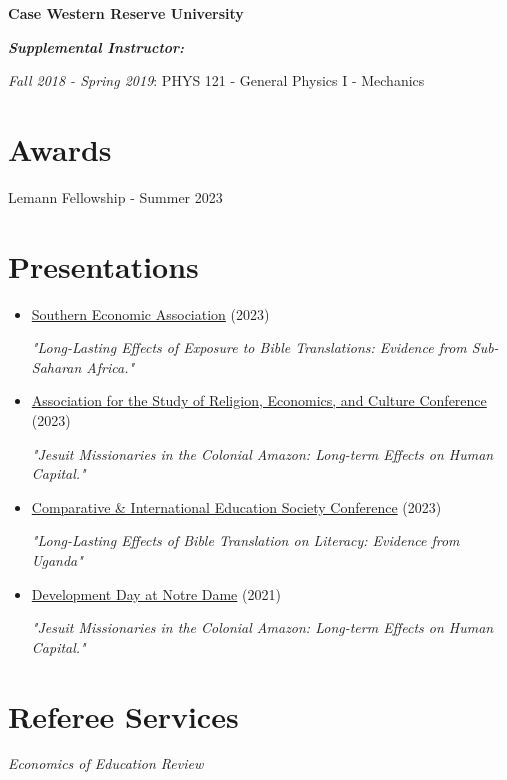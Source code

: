 \documentclass[letterpaper,11pt]{article}
\begin{document}
\begin{adjustwidth}{3mm}{0mm}
  \textbf{Case Western Reserve University}
\end{adjustwidth}

\begin{adjustwidth}{6mm}{0mm}
  \textbf{\textit{Supplemental Instructor:}}
\end{adjustwidth}

\begin{adjustwidth}{9mm}{0mm}
  \textit{Fall 2018 - Spring 2019}: PHYS 121 - General Physics I - Mechanics
\end{adjustwidth}

\section{Awards}

\begin{adjustwidth}{6mm}{0mm}
  Lemann Fellowship - Summer 2023
\end{adjustwidth}

\section{Presentations}
\begin{adjustwidth}{3mm}{0mm}
  \begin{itemize}
    \item \href{https://www.southerneconomic.org/event/7662b305-ad92-474d-8f2c-bce1240b9858/websitePage:e0a9d079-18e0-4413-a0b6-32f8f6b51e64}{Southern Economic Association} (2023) 
    
    \textit{"Long-Lasting Effects of Exposure to Bible Translations: Evidence from Sub-Saharan Africa."}
  \end{itemize}

  \begin{itemize}
    \item \href{http://www.asrec.org/conferences/}{Association for the Study of Religion, Economics, and Culture Conference} (2023) 
    
    \textit{"Jesuit Missionaries in the Colonial Amazon: Long-term Effects on Human Capital."}
  \end{itemize}

  \begin{itemize}
    \item \href{https://cies2023.org/}{Comparative \& International Education Society Conference} (2023) 
    
    \textit{"Long-Lasting Effects of Bible Translation on Literacy: Evidence from Uganda"}
  \end{itemize}

  \begin{itemize}
    \item \href{https://kellogg.nd.edu/development-day-2021#tab-2998}{Development Day at Notre Dame} (2021) 
    
    \textit{"Jesuit Missionaries in the Colonial Amazon: Long-term Effects on Human Capital."}
  \end{itemize}
\end{adjustwidth}

\section{Referee Services}
\begin{adjustwidth}{3mm}{0mm}
\textit{Economics of Education Review}
\end{adjustwidth}
\end{document}

